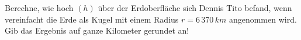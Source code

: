 \begin{beispiel}[AG 4.2]{1}
Berechne, wie hoch $(h)$ über der Erdoberfläche sich Dennis Tito befand, wenn vereinfacht die Erde als Kugel mit einem Radius $r=6\,370\,km$ angenommen wird.
Gib das Ergebnis auf ganze Kilometer gerundet an!
\leer

\end{beispiel}